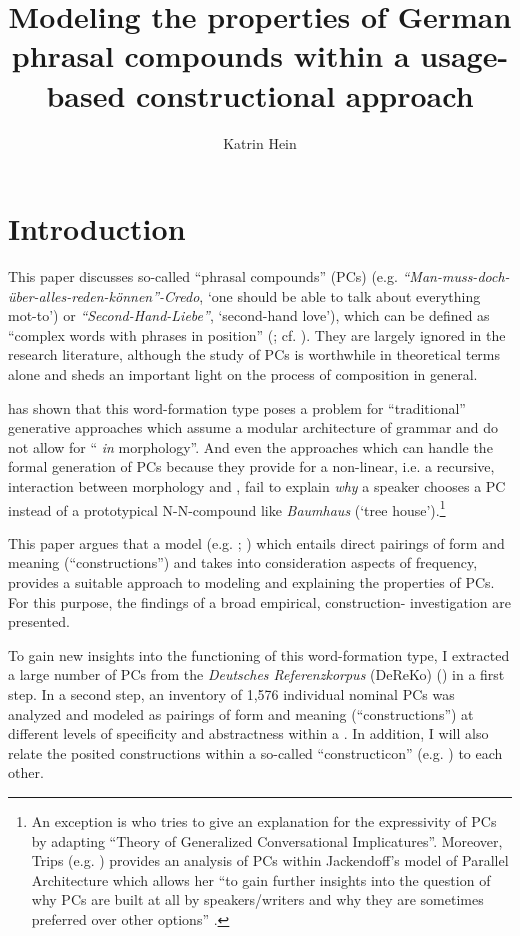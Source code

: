 \documentclass[output=paper]{LSP/langsci}
\author{Katrin Hein\affiliation{Institut für deutsche Sprache, Mannheim}
}
\title{Modeling the properties of German phrasal compounds within a
  usage-based constructional approach}
\begin{document}
\section{Introduction}\label{sec:hein:1}

This paper discusses so-called ``phrasal compounds'' (PCs) (e.g. \textit{``Man-muss-doch-über-alles-reden-können''-Credo}, ‘one should be able to talk about everything mot-\linebreak to’) or \textit{``Second-Hand-Liebe''}, ‘second-hand love'), which can be defined as ``complex words with phrases in  position” (\citealt[153]{Meibauer2003}; cf. \citealt[7]{Lawrenz2006}). They are largely ignored in the research literature, although the study of PCs is worthwhile in theoretical terms alone and sheds an important light on the process of composition in general.

\citet{Hein2011} has shown that this word-formation type poses a problem for ``traditional'' generative approaches which assume a modular architecture of grammar and do not allow for `` \textit{in} morphology''. And even the approaches which can handle the formal generation of PCs because they provide for a non-linear, i.e. a recursive, interaction between morphology and , fail to explain \textit{why} a speaker chooses a PC instead of a prototypical N-N-compound like \textit{Baumhaus} (‘tree house’).\footnote{An exception is \citet{Meibauer2007} who tries to give an explanation for the expressivity of PCs by adapting   ``Theory of Generalized Conversational Implicatures''. Moreover, Trips (e.g. \citealt{Trips2012,Trips2016}) provides an analysis of PCs within Jackendoff’s model of Parallel Architecture which allows her ``to gain further insights into the question of why PCs are built at all by speakers\slash writers and why they are sometimes preferred over other options” \citep[322]{Trips2012}.} 

This paper argues that a   model (e.g. \citealt{Langacker1987}; \citealt{Goldberg2006}) which entails direct pairings of form and meaning (``constructions'') and takes into consideration aspects of frequency, provides a suitable approach to modeling and explaining the properties of PCs. For this purpose, the findings of a broad empirical, construction- investigation are presented. 

To gain new insights into the functioning of this word-formation type, I extracted a large number of  PCs from the \textit{Deutsches Referenzkorpus} (DeRe\-Ko) (\citealt{IDS2011a}) in a first step. In a second step, an inventory of 1,576 individual nominal PCs was analyzed and modeled as pairings of form and meaning (``constructions'') at different levels of specificity and abstractness within a . In addition, I will also relate the posited constructions within a so-called ``constructicon'' (e.g. \citealt[95]{ZiemLasch2013}) to each other. 
\end{document}
